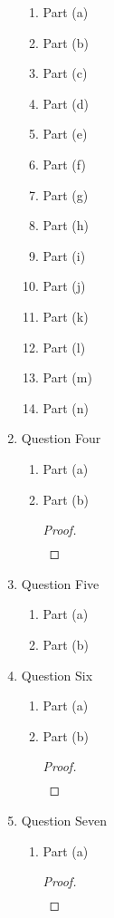 \documentclass{article}
\begin{document}
\begin{enumerate}
\begin{enumerate}
        \item Part (a)
        \item Part (b)
        \item Part (c)
        \item Part (d)
        \item Part (e)
        \item Part (f)
        \item Part (g)
        \item Part (h)
        \item Part (i)
        \item Part (j)
        \item Part (k)
        \item Part (l)
        \item Part (m)
        \item Part (n)
    \end{enumerate}
    \item Question Four
    \begin{enumerate}
        \item Part (a)
        \item Part (b)
        \begin{proof}
            \begin{align}
                &
            \end{align}
        \end{proof}
    \end{enumerate}
    \item Question Five
    \begin{enumerate}
        \item Part (a)
        \item Part (b)
    \end{enumerate}
    \item Question Six
    \begin{enumerate}
        \item Part (a)
        \item Part (b)
        \begin{proof}
            \begin{align}
                &
            \end{align}
        \end{proof}
    \end{enumerate}
    \item Question Seven
    \begin{enumerate}
        \item Part (a)
        \begin{proof}
            \begin{align}
                &
            \end{align}
        \end{proof}
    \end{enumerate}
\end{enumerate}
\end{document}
